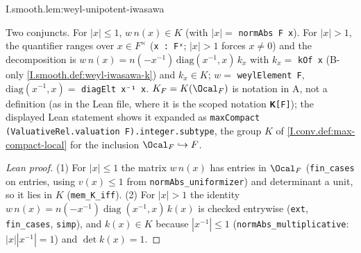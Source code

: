 \begin{lemma}
\end{lemma}
\begin{tfformal}{I.smooth.lem:weyl-unipotent-iwasawa}
\begin{tffidelity}
Two conjuncts. For $|x|\le1$, $w\,n(x)\in K$ (with $|x|=$ \texttt{normAbs F x}). For $|x|>1$, the quantifier ranges over $x\in F^\times$ (\texttt{x : Fˣ}; $|x|>1$ forces $x\ne0$) and the decomposition is $w\,n(x)=n(-x^{-1})\,\mathrm{diag}(x^{-1},x)\,k_x$ with $k_x=$ \texttt{kOf x} (B-only \cref{I.smooth.def:weyl-iwasawa-k}) and $k_x\in K$; $w=$ \texttt{weylElement F}, $\mathrm{diag}(x^{-1},x)=$ \texttt{diagElt x⁻¹ x}. $K_F=K(\Ocal_F)$ is notation in A, not a definition (as in the Lean file, where it is the scoped notation \texttt{𝐊[F]}); the displayed Lean statement shows it expanded as \texttt{maxCompact (ValuativeRel.valuation F).integer.subtype}, the group $K$ of \cref{I.conv.def:max-compact-local} for the inclusion $\Ocal_F\hookrightarrow F$.
\end{tffidelity}
\end{tfformal}
\begin{proof}[Lean proof]
(1) For $|x|\le1$ the matrix $w\,n(x)$ has entries in $\Ocal_F$ (\texttt{fin\_cases} on entries, using $v(x)\le1$ from \texttt{normAbs\_uniformizer}) and determinant a unit, so it lies in $K$ (\texttt{mem\_K\_iff}). (2) For $|x|>1$ the identity $w\,n(x)=n(-x^{-1})\operatorname{diag}(x^{-1},x)\,k(x)$ is checked entrywise (\texttt{ext}, \texttt{fin\_cases}, \texttt{simp}), and $k(x)\in K$ because $|x^{-1}|\le1$ (\texttt{normAbs\_multiplicative}: $|x||x^{-1}|=1$) and $\det k(x)=1$.
\end{proof}


